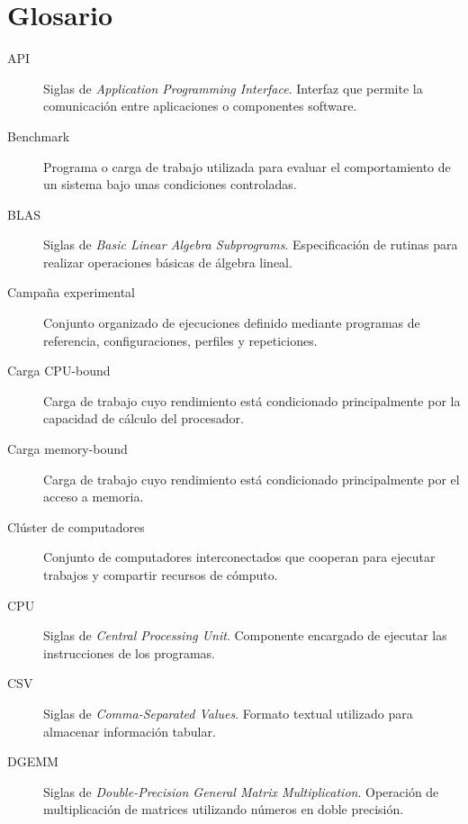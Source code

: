 \chapter*{Glosario}

\begin{description}

    \item[API]
    Siglas de \textit{Application Programming Interface}. Interfaz que permite la comunicación entre aplicaciones o componentes software.

    \item[Benchmark]
    Programa o carga de trabajo utilizada para evaluar el comportamiento de un sistema bajo unas condiciones controladas.

    \item[BLAS]
    Siglas de \textit{Basic Linear Algebra Subprograms}. Especificación de rutinas para realizar operaciones básicas de álgebra lineal.

    \item[Campaña experimental]
    Conjunto organizado de ejecuciones definido mediante programas de referencia, configuraciones, perfiles y repeticiones.

    \item[Carga CPU-bound]
    Carga de trabajo cuyo rendimiento está condicionado principalmente por la capacidad de cálculo del procesador.

    \item[Carga memory-bound]
    Carga de trabajo cuyo rendimiento está condicionado principalmente por el acceso a memoria.

    \item[Clúster de computadores]
    Conjunto de computadores interconectados que cooperan para ejecutar trabajos y compartir recursos de cómputo.

    \item[CPU]
    Siglas de \textit{Central Processing Unit}. Componente encargado de ejecutar las instrucciones de los programas.

    \item[CSV]
    Siglas de \textit{Comma-Separated Values}. Formato textual utilizado para almacenar información tabular.

    \item[DGEMM]
    Siglas de \textit{Double-Precision General Matrix Multiplication}. Operación de multiplicación de matrices utilizando números en doble precisión.


\end{description}

